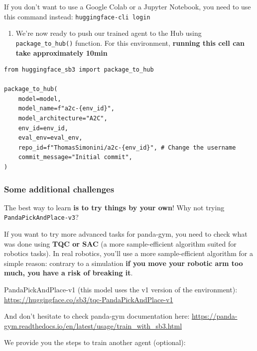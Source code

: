 \documentclass[11pt,a4paper]{article}
\begin{document}
If you don't want to use a Google Colab or a Jupyter Notebook, you need to use this command instead: \texttt{huggingface-cli\ login}

\begin{enumerate}
\def\labelenumi{\arabic{enumi}.}
\setcounter{enumi}{2}
\tightlist
\item
  We're now ready to push our trained agent to the Hub using \texttt{package\_to\_hub()} function. For this environment, \textbf{running this cell can take approximately 10min}
\end{enumerate}

\begin{lstlisting}
from huggingface_sb3 import package_to_hub

package_to_hub(
    model=model,
    model_name=f"a2c-{env_id}",
    model_architecture="A2C",
    env_id=env_id,
    eval_env=eval_env,
    repo_id=f"ThomasSimonini/a2c-{env_id}", # Change the username
    commit_message="Initial commit",
)
\end{lstlisting}

\subsubsection{Some additional challenges}\label{some-additional-challenges}

The best way to learn \textbf{is to try things by your own}! Why not trying \texttt{PandaPickAndPlace-v3}?

If you want to try more advanced tasks for panda-gym, you need to check what was done using \textbf{TQC or SAC} (a more sample-efficient algorithm suited for robotics tasks). In real robotics, you'll use a more sample-efficient algorithm for a simple reason: contrary to a simulation \textbf{if you move your robotic arm too much, you have a risk of breaking it}.

PandaPickAndPlace-v1 (this model uses the v1 version of the environment): \url{https://huggingface.co/sb3/tqc-PandaPickAndPlace-v1}

And don't hesitate to check panda-gym documentation here: \url{https://panda-gym.readthedocs.io/en/latest/usage/train_with_sb3.html}

We provide you the steps to train another agent (optional):
\end{document}

